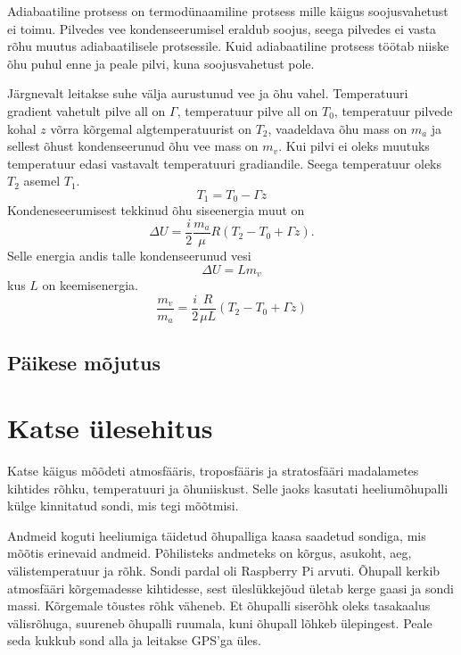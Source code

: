 \documentclass{trkut}%
\begin{document}
Adiabaatiline protsess on termodünaamiline protsess mille käigus soojusvahetust ei toimu. Pilvedes vee kondenseerumisel eraldub soojus, seega pilvedes ei vasta rõhu muutus adiabaatilisele protsessile. Kuid adiabaatiline protsess töötab niiske õhu puhul enne ja peale pilvi, kuna soojusvahetust pole.

Järgnevalt leitakse suhe välja aurustunud vee ja õhu vahel. Temperatuuri gradient vahetult pilve all on $\Gamma$, temperatuur pilve all on $T_0$, temperatuur pilvede kohal $z$ võrra kõrgemal algtemperatuurist on $T_2$, vaadeldava õhu mass on $m_a$ ja sellest õhust kondenseerunud õhu vee mass on $m_v$. Kui pilvi ei oleks muutuks temperatuur edasi vastavalt temperatuuri gradiandile. Seega temperatuur oleks $T_2$ asemel $T_1$.
\begin{equation*}
T_1 = T_0 - \Gamma z
\end{equation*}
Kondeneseerumisest tekkinud õhu siseenergia muut on
\begin{equation*}
\Delta U = \frac{i}{2}\frac{m_a}{\mu}R\left(T_2 - T_0 + \Gamma z\right).
\end{equation*}
Selle energia andis talle kondenseerunud vesi
\begin{equation*}
\Delta U = L m_v
\end{equation*}
kus $L$ on keemisenergia.
\begin{equation*}
\frac{m_v}{m_a} = \frac{i}{2}\frac{R}{\mu L}\left(T_2- T_0 + \Gamma z\right)
\end{equation*}


\section{Päikese mõjutus}



\chapter{Katse ülesehitus}
Katse käigus mõõdeti atmosfääris, troposfääris ja stratosfääri madalametes kihtides rõhku, temperatuuri ja õhuniiskust. Selle jaoks kasutati heeliumõhupalli külge kinnitatud sondi, mis tegi mõõtmisi.

Andmeid koguti heeliumiga täidetud õhupalliga kaasa saadetud sondiga, mis mõõtis erinevaid andmeid. Põhilisteks andmeteks on kõrgus, asukoht, aeg, välistemperatuur ja rõhk. Sondi pardal oli Raspberry Pi arvuti. Õhupall kerkib atmosfääri kõrgemadesse kihtidesse, sest üleslükkejõud ületab kerge gaasi ja sondi massi. Kõrgemale tõustes rõhk väheneb. Et õhupalli siserõhk oleks tasakaalus välisrõhuga, suureneb õhupalli ruumala, kuni õhupall lõhkeb ülepingest. Peale seda kukkub sond alla ja leitakse GPS'ga üles.
\end{document}
